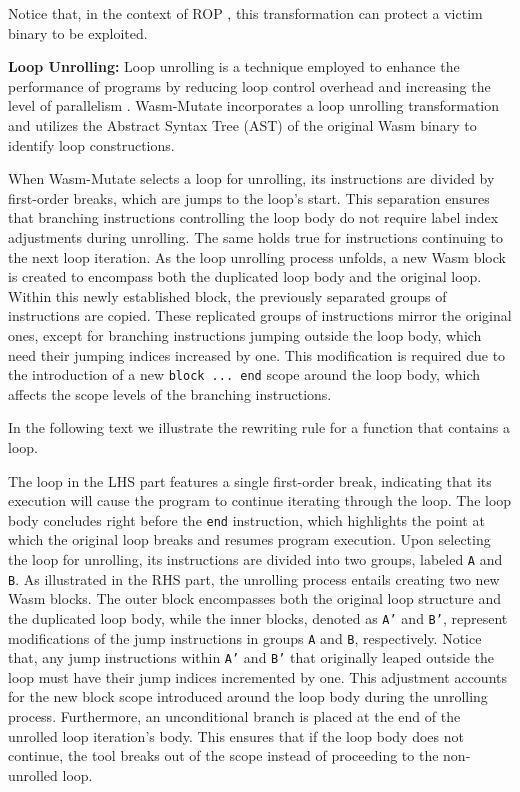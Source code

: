 \documentclass[sigplan,screen]{acmart}
\newcommand{\tool}{{\sc Wasm-Mutate}\xspace}
\begin{document}
Notice that, in the context of ROP \cite{Swivel}, this transformation can protect a victim binary to be exploited. 



\textbf{Loop Unrolling:} 
Loop unrolling is a technique employed to enhance the performance of programs by reducing loop control overhead and increasing the level of parallelism \cite{dongarra1979unrolling}. 
\tool incorporates a loop unrolling transformation and utilizes the Abstract Syntax Tree (AST) of the original Wasm binary to identify loop constructions. 

When \tool selects a loop for unrolling, its instructions are divided by first-order breaks, which are jumps to the loop's start. This separation ensures that branching instructions controlling the loop body do not require label index adjustments during unrolling. The same holds true for instructions continuing to the next loop iteration.
As the loop unrolling process unfolds, a new Wasm block is created to encompass both the duplicated loop body and the original loop. 
Within this newly established block, the previously separated groups of instructions are copied. 
These replicated groups of instructions mirror the original ones, except for branching instructions jumping outside the loop body, which need their jumping indices increased by one. This modification is required due to the introduction of a new \texttt{block ... end} scope around the loop body, which affects the scope levels of the branching instructions.

In the following text we illustrate the rewriting rule for a function that contains a loop. 


The loop in the LHS part features a single first-order break, indicating that its execution will cause the program to continue iterating through the loop. 
The loop body concludes right before the \texttt{end} instruction, which highlights the point at which the original loop breaks and resumes program execution.
Upon selecting the loop for unrolling, its instructions are divided into two groups, labeled \texttt{A} and \texttt{B}. 
As illustrated in the RHS part, the unrolling process entails creating two new Wasm blocks. 
The outer block encompasses both the original loop structure and the duplicated loop body, while the inner blocks, denoted as \texttt{A'} and \texttt{B'}, represent modifications of the jump instructions in groups \texttt{A} and \texttt{B}, respectively.
Notice that, any jump instructions within \texttt{A'} and \texttt{B'} that originally leaped outside the loop must have their jump indices incremented by one. 
This adjustment accounts for the new block scope introduced around the loop body during the unrolling process. 
Furthermore, an unconditional branch is placed at the end of the unrolled loop iteration's body. 
This ensures that if the loop body does not continue, the tool breaks out of the scope instead of proceeding to the non-unrolled loop.
\end{document}
